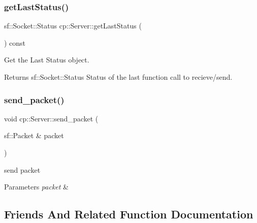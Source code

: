 \subsubsection{\texorpdfstring{get\+Last\+Status()}{getLastStatus()}}
{\footnotesize\ttfamily sf\+::\+Socket\+::\+Status cp\+::\+Server\+::get\+Last\+Status (\begin{DoxyParamCaption}{ }\end{DoxyParamCaption}) const\hspace{0.3cm}{\ttfamily [inline]}}



Get the Last Status object. 

\begin{DoxyReturn}{Returns}
sf\+::\+Socket\+::\+Status Status of the last function call to recieve/send. 
\end{DoxyReturn}
\mbox{\label{classcp_1_1_server_abe6024ffde0c27bb4c1c7a14c206df5a}} 
\subsubsection{\texorpdfstring{send\+\_\+packet()}{send\_packet()}}
{\footnotesize\ttfamily void cp\+::\+Server\+::send\+\_\+packet (\begin{DoxyParamCaption}\item[{sf\+::\+Packet \&}]{packet }\end{DoxyParamCaption})\hspace{0.3cm}{\ttfamily [inline]}}



send packet 


\begin{DoxyParams}{Parameters}
{\em packet} & \\
\hline
\end{DoxyParams}


\subsection{Friends And Related Function Documentation}
\mbox{\label{classcp_1_1_server_a996961461d4083fbb237bce454c42c3f}} 
